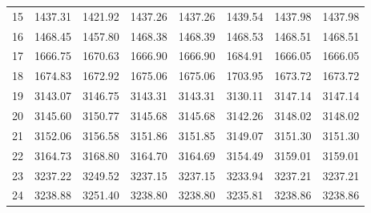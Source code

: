 \documentclass[10pt,oneside]{article}
\begin{document}
\begin{table}[h!]
\begin{tabular}{cccccccc}
15 &   1437.31 & 1421.92 & 1437.26 &    1437.26 &      1439.54 & 1437.98 &   1437.98 \\
16 &   1468.45 & 1457.80 & 1468.38 &    1468.39 &      1468.53 & 1468.51 &   1468.51 \\
17 &   1666.75 & 1670.63 & 1666.90 &    1666.90 &      1684.91 & 1666.05 &   1666.05 \\
18 &   1674.83 & 1672.92 & 1675.06 &    1675.06 &      1703.95 & 1673.72 &   1673.72 \\
19 &   3143.07 & 3146.75 & 3143.31 &    3143.31 &      3130.11 & 3147.14 &   3147.14 \\
20 &   3145.60 & 3150.77 & 3145.68 &    3145.68 &      3142.26 & 3148.02 &   3148.02 \\
21 &   3152.06 & 3156.58 & 3151.86 &    3151.85 &      3149.07 & 3151.30 &   3151.30 \\
22 &   3164.73 & 3168.80 & 3164.70 &    3164.69 &      3154.49 & 3159.01 &   3159.01 \\
23 &   3237.22 & 3249.52 & 3237.15 &    3237.15 &      3233.94 & 3237.21 &   3237.21 \\
24 &   3238.88 & 3251.40 & 3238.80 &    3238.80 &      3235.81 & 3238.86 &   3238.86 \\
\bottomrule
\end{tabular}
\end{table}
\end{document}
